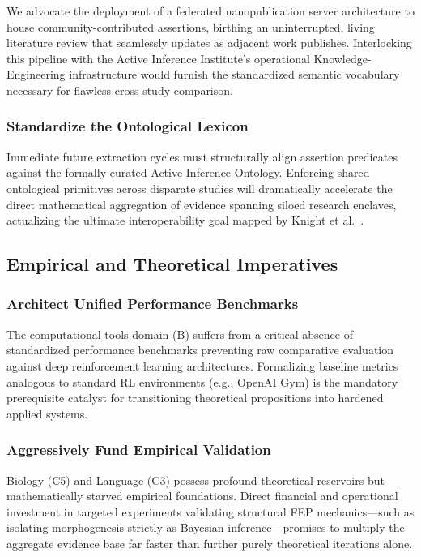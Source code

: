 \documentclass[
]{article}
\begin{document}
We advocate the deployment of a federated nanopublication server
architecture to house community-contributed assertions, birthing an
uninterrupted, living literature review that seamlessly updates as
adjacent work publishes. Interlocking this pipeline with the Active
Inference Institute's operational Knowledge-Engineering infrastructure
\citep{knight2022fep} would furnish the standardized semantic vocabulary
necessary for flawless cross-study comparison.

\subsubsection{Standardize the Ontological
Lexicon}\label{standardize-the-ontological-lexicon}

Immediate future extraction cycles must structurally align assertion
predicates against the formally curated Active Inference Ontology.
Enforcing shared ontological primitives across disparate studies will
dramatically accelerate the direct mathematical aggregation of evidence
spanning siloed research enclaves, actualizing the ultimate
interoperability goal mapped by Knight et al.~\citep{knight2022fep}.

\subsection{Empirical and Theoretical
Imperatives}\label{empirical-and-theoretical-imperatives}

\subsubsection{Architect Unified Performance
Benchmarks}\label{architect-unified-performance-benchmarks}

The computational tools domain (B) suffers from a critical absence of
standardized performance benchmarks preventing raw comparative
evaluation against deep reinforcement learning architectures.
Formalizing baseline metrics analogous to standard RL environments
(e.g., OpenAI Gym) is the mandatory prerequisite catalyst for
transitioning theoretical propositions into hardened applied systems.

\subsubsection{Aggressively Fund Empirical
Validation}\label{aggressively-fund-empirical-validation}

Biology (C5) and Language (C3) possess profound theoretical reservoirs
but mathematically starved empirical foundations. Direct financial and
operational investment in targeted experiments validating structural FEP
mechanics---such as isolating morphogenesis strictly as Bayesian
inference---promises to multiply the aggregate evidence base far faster
than further purely theoretical iterations alone.
\end{document}
